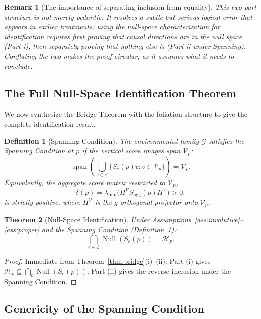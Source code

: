 \documentclass[11pt,a4paper]{article}
\newtheorem{theorem}{Theorem}[section]
\newtheorem{definition}[theorem]{Definition}
\newtheorem{remark}{Remark}
\DeclareMathOperator{\Null}{Null}
\DeclareMathOperator{\spa}{span}
\newcommand{\cG}{\mathcal{G}}
\newcommand{\cH}{\mathcal{H}}
\newcommand{\cV}{\mathcal{V}}
\newcommand{\cE}{\mathcal{E}}
\begin{document}
\begin{remark}[The importance of separating inclusion from equality]
This two-part structure is not merely pedantic. It resolves a subtle but serious logical error that appears in earlier treatments: using the null-space characterization for identification requires first \emph{proving} that causal directions are in the null space (Part i), then separately \emph{proving} that nothing else is (Part ii under Spanning). Conflating the two makes the proof circular, as it assumes what it needs to conclude.
\end{remark}

\subsection{The Full Null-Space Identification Theorem}

We now synthesize the Bridge Theorem with the foliation structure to give the complete identification result.

\begin{definition}[Spanning Condition]\label{def:spanning}
The environmental family $\cG$ satisfies the \emph{Spanning Condition} at $p$ if the vertical score images span $\cV_p$:
\[
\spa\!\left(\bigcup_{e \in \cE} \{S_e(p) v : v \in \cV_p\}\right) = \cV_p.
\]
Equivalently, the aggregate score matrix restricted to $\cV_p$,
\[
\delta(p) = \lambda_{\min}\!\bigl(\Pi^{\cV} S_{\mathrm{agg}}(p) \Pi^{\cV}\bigr) > 0,
\]
is strictly positive, where $\Pi^{\cV}$ is the $g$-orthogonal projector onto $\cV_p$.
\end{definition}

\begin{theorem}[Null-Space Identification]\label{thm:null_space_id}
Under Assumptions~\ref{ass:involutive}--\ref{ass:proper} and the Spanning Condition (Definition~\ref{def:spanning}):
\[
\bigcap_{e \in \cE} \Null(S_e(p)) = \cH_p.
\]
\end{theorem}

\begin{proof}
Immediate from Theorem~\ref{thm:bridge}(i)–(ii): Part (i) gives $\cH_p \subseteq \bigcap_e \Null(S_e(p))$; Part (ii) gives the reverse inclusion under the Spanning Condition.
\end{proof}

\subsection{Genericity of the Spanning Condition}
\end{document}
